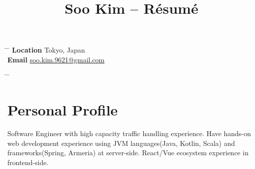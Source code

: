 \documentclass[10pt]{article} %
\begin{document}

\title{Soo Kim -- Résumé} %


\parbox[c][3em][c]{0.5\textwidth}{ %
\begin{tabbing} %
\hspace{4cm} \= \hspace{4cm} \= \kill %
\textbf{Location} \> Tokyo, Japan\\ %
\textbf{Email} \> \href{mailto:soo.kim.9621@gmail.com}{soo.kim.9621@gmail.com}\\ %
\end{tabbing}
}
\hfill %
\parbox[c][3em][c]{0.5\textwidth}{ %
\begin{tabbing} %
\hspace{4cm} \= \hspace{4cm} \= \kill %
\\
\end{tabbing}}


\section{Personal Profile}

Software Engineer with high capacity traffic handling experience. Have hands-on web development experience using JVM languages(Java, Kotlin, Scala) and frameworks(Spring, Armeria) at server-side. React/Vue ecosystem experience in frontend-side.
\end{document}
